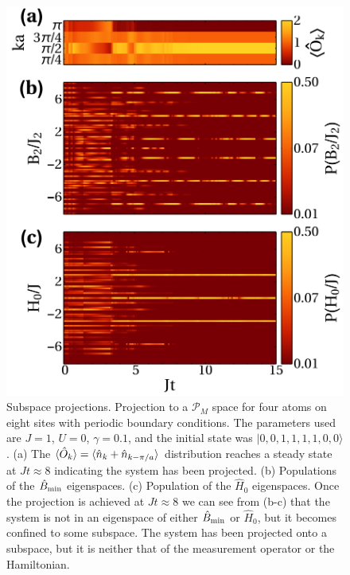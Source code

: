 \begin{figure}[hbtp!]
	\includegraphics[width=\linewidth]{Projections}
	\caption[Projections for Non-Commuting Observable and
        Hamiltonian] {Subspace projections. Projection to a
          $\mathcal{P}_M$ space for four atoms on eight sites with
          periodic boundary conditions. The parameters used are $J=1$,
          $U=0$, $\gamma = 0.1$, and the initial state was
          $| 0,0,1,1,1,1,0,0 \rangle$. (a) The
          $\langle \hat{O}_k \rangle = \langle \hat{n}_k + \hat{n}_{k - \pi/a}
          \rangle$ distribution reaches a steady state at
          $Jt \approx 8$ indicating the system has been projected. (b)
          Populations of the $\hat{B}_\mathrm{min}$ eigenspaces. (c) Population of
          the $\hat{H}_0$ eigenspaces. Once the projection is achieved
          at $Jt\approx8$ we can see from (b-c) that the system is not
          in an eigenspace of either $\hat{B}_\mathrm{min}$ or $\hat{H}_0$, but it
          becomes confined to some subspace. The system has been
          projected onto a subspace, but it is neither that of the
          measurement operator or the
          Hamiltonian. \label{fig:projections}}
\end{figure}

